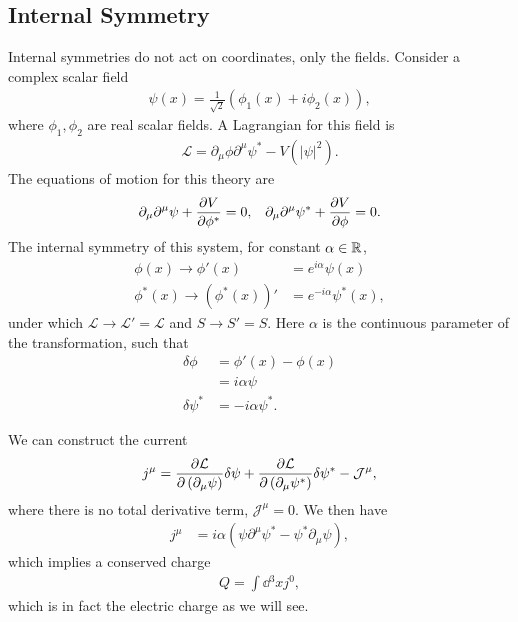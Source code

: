 
\subsection{Internal Symmetry}


\begin{example}
    Internal symmetries do not act on coordinates, only the fields. Consider a complex scalar field
    \begin{align}
        \psi \left( x \right) = \frac{1}{\sqrt{2} } \left( \phi_{1} \left( x \right) + i \phi_2 \left( x \right)  \right) 
    ,\end{align}
    where $\phi_1 ,\phi_2$ are real scalar fields. A Lagrangian for this field is
    \begin{align}
        \mathcal{L} = \partial_\mu \phi \partial^{\mu} \psi^{*} - V \left( \left| \psi \right|^2 \right) 
    .\end{align}
    The equations of motion for this theory are
    \begin{align}
        \partial_\mu \partial^{\mu} \psi + \pdv{V}{\phi^{*}} = 0, && \partial_\mu \partial^{\mu} \psi^{*} + \pdv{V}{\phi} = 0
    .\end{align}
    The internal symmetry of this system, for constant $\alpha \in \mathbb{R}$,
    \begin{align}
        \phi \left( x \right) \to \phi' \left( x \right) &= e^{i \alpha} \psi \left( x \right) \label{eq:global_phase}  \\
        \phi^{*} \left( x \right) \to \left( \phi^{*} \left( x \right)  \right)' &= e^{-i\alpha} \psi^{*} \left( x \right) 
    ,\end{align}
    under which $\mathcal{L} \to \mathcal{L}' = \mathcal{L}$ and $S \to S' = S$. Here $\alpha$ is the continuous parameter of the transformation, such that
    \begin{align}
        \delta \phi &= \phi' \left( x \right) - \phi \left( x \right)  \\
        &= i \alpha \psi \\
        \delta \psi^{*} &= -i \alpha \psi^{*}
    .\end{align}

    We can construct the current
    \begin{align}
        j^{\mu} = \pdv{\mathcal{L}}{\left( \partial_\mu \psi \right) } \delta \psi + \pdv{\mathcal{L}}{\left( \partial_\mu \psi^{*} \right) } \delta \psi^{*} - \mathcal{J}^{\mu}
    ,\end{align}
    where there is no total derivative term, $\mathcal{J}^{\mu} = 0$. We then have
    \begin{align}
        j^{\mu} &= i \alpha \left( \psi \partial^{\mu} \psi^{*} - \psi^{*} \partial_\mu \psi \right) 
    ,\end{align}
    which implies a conserved charge
    \begin{align}
        Q = \int \dd{^3x} j^{0}
    ,\end{align}
    which is in fact the electric charge as we will see.


\end{example}

